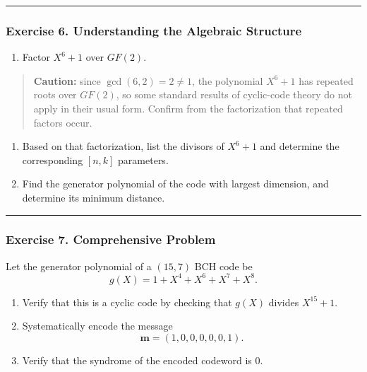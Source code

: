\documentclass[
]{article}
\providecommand{\tightlist}{%
  \setlength{\itemsep}{0pt}\setlength{\parskip}{0pt}}
\begin{document}
\begin{center}\rule{0.5\linewidth}{0.5pt}\end{center}

\subsubsection{Exercise 6. Understanding the Algebraic
Structure}\label{exercise-6.-understanding-the-algebraic-structure}

\begin{enumerate}
\def\labelenumi{(\alph{enumi})}
\tightlist
\item
  Factor \(X^6+1\) over \(GF(2)\).
\end{enumerate}

\begin{quote}
\textbf{Caution:} since \(\gcd(6,2)=2 \neq 1\), the polynomial \(X^6+1\)
has repeated roots over \(GF(2)\), so some standard results of
cyclic-code theory do not apply in their usual form. Confirm from the
factorization that repeated factors occur.
\end{quote}

\begin{enumerate}
\def\labelenumi{(\alph{enumi})}
\setcounter{enumi}{1}
\item
  Based on that factorization, list the divisors of \(X^6+1\) and
  determine the corresponding \([n,k]\) parameters.
\item
  Find the generator polynomial of the code with largest dimension, and
  determine its minimum distance.
\end{enumerate}

\begin{center}\rule{0.5\linewidth}{0.5pt}\end{center}

\subsubsection{Exercise 7. Comprehensive
Problem}\label{exercise-7.-comprehensive-problem}

Let the generator polynomial of a \((15,7)\) BCH code be
\[g(X)=1+X^4+X^6+X^7+X^8.\]

\begin{enumerate}
\def\labelenumi{(\alph{enumi})}
\item
  Verify that this is a cyclic code by checking that \(g(X)\) divides
  \(X^{15}+1\).
\item
  Systematically encode the message \[\mathbf{m}=(1,0,0,0,0,0,1).\]
\item
  Verify that the syndrome of the encoded codeword is 0.
\end{enumerate}
\end{document}
